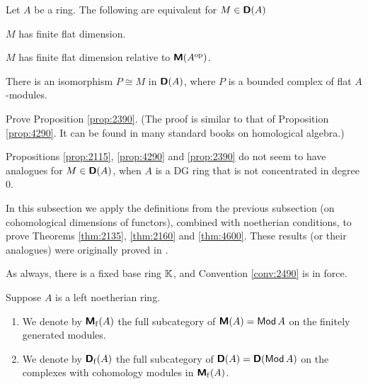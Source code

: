 \begin{prop} \label{prop:2390}
Let $A$ be a ring. The following are equivalent for $M \in \boldsymbol{\mathsf{D}}(A)$\tup{:}
\begin{enumerate}
 $M$ has finite flat dimension.

 $M$ has finite flat dimension relative to 
$\boldsymbol{\mathsf{M}}(A^{\mathrm{op}})$.

 There is an isomorphism $P \cong M$ in $\boldsymbol{\mathsf{D}}(A)$, 
where $P$ is a bounded complex of flat $A$-modules.
\end{enumerate}
\end{prop}

\begin{exer} \label{exer:2391}
Prove Proposition \ref{prop:2390}. (The proof is similar to that of Proposition 
\ref{prop:4290}. It can be found in many standard books on homological algebra.)
\end{exer}

\begin{rem} \label{rem:4785}
Propositions \ref{prop:2115}, \ref{prop:4290} and \ref{prop:2390} do not seem 
to have analogues for $M \in \boldsymbol{\mathsf{D}}(A)$, when $A$ is a DG ring that is not 
concentrated in degree $0$. 
\end{rem}

 




\label{subsec:thm-funcs-fin}

In this subsection we apply the definitions from the previous subsection 
(on cohomological dimensions of functors), combined with noetherian conditions,
to prove Theorems \ref{thm:2135}, \ref{thm:2160} and \ref{thm:4600}. 
These results (or their analogues) were originally proved in 
\cite[Section II.7]{RD}. 

As always, there is a fixed base ring $\mathbb{K}$, and 
Convention \ref{conv:2490} is in force.

\begin{dfn} \label{dfn:2135}
Suppose $A$ is a left noetherian ring. 
\begin{enumerate}
\item We denote by $\boldsymbol{\mathsf{M}}_{\mathrm{f}}(A)$ the full subcategory of 
$\boldsymbol{\mathsf{M}}(A) = \operatorname{\mathsf{Mod}}A$ on the finitely generated modules. 

\item  We denote by $\boldsymbol{\mathsf{D}}_{\mathrm{f}}(A)$ the full subcategory of 
$\boldsymbol{\mathsf{D}}(A) = \boldsymbol{\mathsf{D}}(\operatorname{\mathsf{Mod}} A)$ on the complexes with cohomology modules
in $\boldsymbol{\mathsf{M}}_{\mathrm{f}}(A)$.
\end{enumerate}
\end{dfn}

